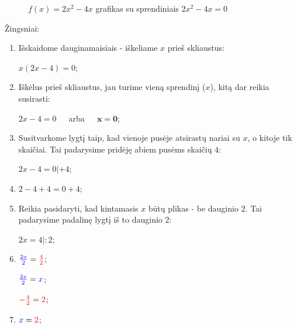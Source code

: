\documentclass[a4paper]{article}
\begin{document}
\begin{figure}[!htbp]
      \begin{center}
      \end{center}
      \caption{$f(x)=2x^2-4x$ grafikas su sprendiniais $2x^2-4x=0$
      }\label{fx=2x2-4x}
\end{figure}

Žingsniai:
\begin{enumerate}

      \item  Išskaidome dauginamaisiais - iškeliame $ x $ prieš skliaustus:

            $ x(2x - 4) = 0 $;
      \item  Iškėlus prieš skliaustus, jau turime vieną sprendinį ($ x $), kitą
            dar reikia susirasti:

            $ 2x-4 = 0 $ $\;\;\;$ arba $\;\;\;$ $ \boldsymbol{x=0} $;
      \item  Susitvarkome lygtį taip, kad vienoje pusėje atsirastų nariai su $
                  x
            $, o kitoje tik skaičiai. Tai padarysime pridėję abiem pusėms
            skaičių
            $ 4 $:

            $ 2x-4 = 0 | + 4 $;
      \item  $ 2-4+4 = 0+4 $;
      \item Reikia pasidaryti, kad kintamasis $ x $ būtų plikas - be dauginio $
                  2
            $. Tai padarysime padalinę lygtį iš to dauginio $ 2 $:

            $ 2x = 4 | : 2 $;
      \item $ \textcolor{blue}{\frac{2x}{2}} = \textcolor{red}{\frac{4}{2}} $;

            $ \textcolor{blue}{\frac{2x}{2}}=\textcolor{blue}{x} $;

            $ \textcolor{red}{-\frac{4}{2}}=\textcolor{red}{2} $;

      \item $ \textcolor{blue}{x} = \textcolor{red}{2} $;
\end{enumerate}
\end{document}
